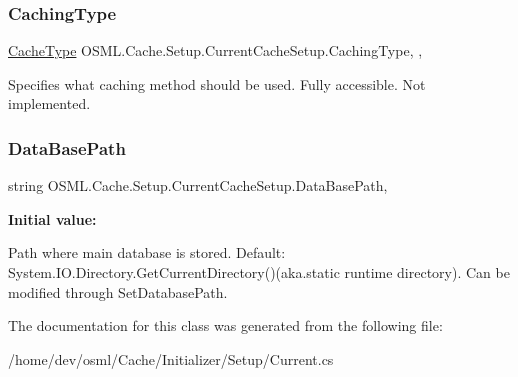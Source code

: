 \subsubsection{\texorpdfstring{CachingType}{CachingType}}
{\footnotesize\ttfamily \mbox{\hyperlink{namespaceOSML_1_1Cache_1_1Setup_abdb98825a257abbcae6c186d8ba7a088}{Cache\+Type}} O\+S\+M\+L.\+Cache.\+Setup.\+Current\+Cache\+Setup.\+Caching\+Type\hspace{0.3cm}{\ttfamily [static]}, {\ttfamily [get]}, {\ttfamily [set]}}



Specifies what caching method should be used. Fully accessible. Not implemented. 

\mbox{\label{classOSML_1_1Cache_1_1Setup_1_1CurrentCacheSetup_a1eff786a11c1515e84ff7195b72bdffa}} 
\subsubsection{\texorpdfstring{DataBasePath}{DataBasePath}}
{\footnotesize\ttfamily string O\+S\+M\+L.\+Cache.\+Setup.\+Current\+Cache\+Setup.\+Data\+Base\+Path\hspace{0.3cm}{\ttfamily [static]}, {\ttfamily [get]}}

{\bfseries Initial value\+:}
\begin{DoxyCode}{0}
\DoxyCodeLine{= }

\end{DoxyCode}


Path where main database is stored. Default\+: System.\+I\+O.\+Directory.\+Get\+Current\+Directory()(aka.\+static runtime directory). Can be modified through Set\+Database\+Path. 



The documentation for this class was generated from the following file\+:\begin{DoxyCompactItemize}
\item 
/home/dev/osml/\+Cache/\+Initializer/\+Setup/Current.\+cs\end{DoxyCompactItemize}
